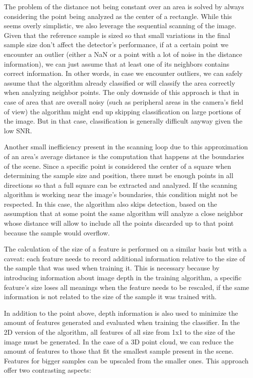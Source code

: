 \documentclass[a4paper,12pt,titlepage]{article}
\begin{document}
The problem of the distance not being constant over an area is solved by always
considering the point being analyzed as the center of a rectangle. While this
seems overly simplistic, we also leverage the sequential scanning of the image.
Given that the reference sample is sized so that small variations in the final
sample size don't affect the detector's performance, if at a certain point we
encounter an outlier (either a NaN or a point with a lot of noise in the
distance information), we can just assume that at least one of its neighbors
contains correct information. In other words, in case we encounter outliers, we
can safely assume that the algorithm already classified or will classify the
area correctly when analyzing neighbor points.
The only downside of this approach is that in case of area that are overall
noisy (such as peripheral areas in the camera's field of view) the algorithm
might end up skipping classification on large portions of the image. But in that
case, classification is generally difficult anyway given the low SNR.

Another small inefficiency present in the scanning loop due to this
approximation of an area's average distance is the computation that happens at
the boundaries of the scene. Since a specific point is considered the center of
a square when determining the sample size and position, there must be enough
points in all directions so that a full square can be extracted and analyzed. If
the scanning algorithm is working near the image's boundaries, this condition
might not be respected. In this case, the algorithm also skips detection, based
on the assumption that at some point the same algorithm will analyze a close
neighbor whose distance will allow to include all the points discarded up to
that point because the sample would overflow.

The calculation of the size of a feature is performed on a similar basis but
with a caveat: each feature needs to record additional information relative to
the size of the sample that was used when training it. This is necessary because
by introducing information about image depth in the training algorithm, a
specific feature's size loses all meanings when the feature needs to be
rescaled, if the same information is not related to the size of the sample it
was trained with.

In addition to the point above, depth information is also used to minimize the
amount of features generated and evaluated when training the classifier. In the
2D version of the algorithm, all features of all size from 1x1 to the size of
the image must be generated. In the case of a 3D point cloud, we can reduce the
amount of features to those that fit the smallest sample present in the scene.
Features for bigger samples can be upscaled from the smaller ones. This approach
offer two contrasting aspects:
\end{document}
